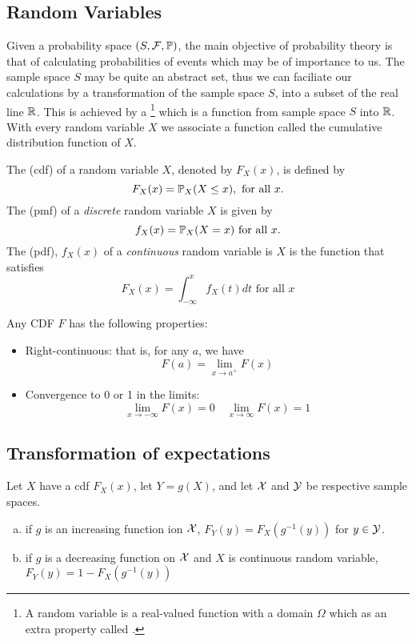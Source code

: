 \subsection{Random Variables}
Given a probability space $(S, \mathcal F, \mathbb P)$, the main objective of probability theory is that of calculating probabilities of events which may be of importance to us. The sample space $S$ may be quite an abstract set, thus we can faciliate our calculations by a transformation of the sample space $S$, into a subset of the real line $\mathbb R$. This is achieved by a 
\footnote{A random variable is a real-valued function with a domain $\Omega$ which as an extra property called .}
which is a function from sample space $S$ into $\mathbb R$.
With every random variable $X$ we associate a function called the cumulative distribution function of $X$.


\begin{definition}
    The  (cdf) of a random variable $X$, denoted by $F_{X}(x)$, is defined by 
    $$
    F_X(x) = \mathbb P_X(X\leq x), \text{ for all } x.
    $$
    The  (pmf) of a \textit{discrete} random variable $X$ is given by
    $$
    f_X(x) = \mathbb P_X(X=x) \text{ for all } x.
    $$
    The  (pdf), $f_X(x)$ of a \textit{continuous} random variable is $X$ is the function that satisfies
    $$
    F_X(x) = \int_{-\infty}^{x}f_X(t)dt \text{ for all } x
    $$
\end{definition}
\begin{proposition}
    Any CDF $F$ has the following properties:
    \begin{itemize}
        \item Right-continuous: that is, for any $a$, we have
        $$
        F(a) = \lim_{x \to a^{+}}F(x)
        $$
        \item Convergence to 0 or 1 in the limits:
            $$
            \lim_{x \to - \infty} F(x) =0 \quad
            \lim_{x \to \infty} F(x) =1
            $$
    \end{itemize}
\end{proposition}

\subsection{Transformation of expectations}
\begin{theorem}
    Let $X$ have a cdf $F_X(x)$, let $Y=g(X)$, and let $\mathcal X$ and $\mathcal Y$ be respective sample spaces.
    \begin{enumerate}[(a)]
        \item if $g$ is an increasing function ion $\mathcal X$, $F_Y(y) = F_X(g^{-1}(y))$ for $y \in \mathcal Y$.
        \item if $g$ is a decreasing function on $\mathcal X$ and $X$ is continuous random variable, $F_Y(y) = 1-F_X(g^{-1}(y))$
    \end{enumerate}
\end{theorem}

